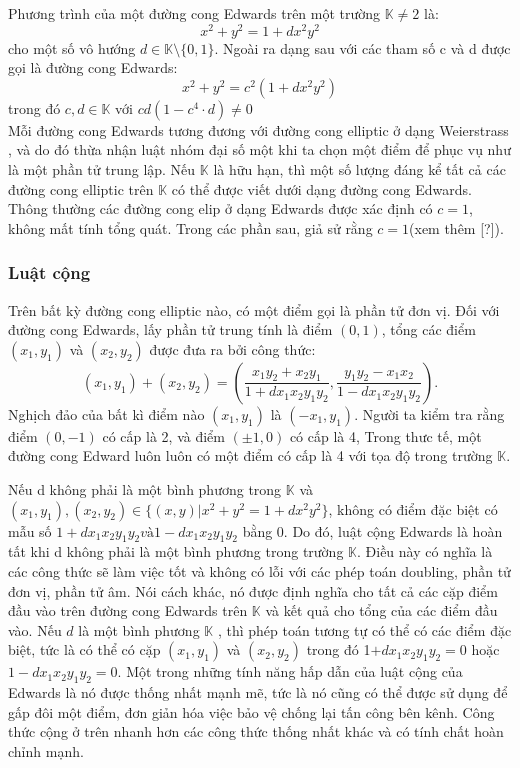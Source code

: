 \documentclass[a4paper,12pt]{report}
\begin{document}
Phương trình của một đường cong Edwards trên một trường $\mathbb{K} \neq 2$ là:
\begin{displaymath}
x^{2}+y^{2}=1+dx^{2}y^{2}
\end{displaymath}
cho một số vô hướng  $d \in \mathbb{K} \setminus \{0,1\}$. Ngoài ra dạng sau với các tham số c và d được gọi là đường cong Edwards:
\begin{displaymath}
x^2 + y^2 = c^2(1 + dx^2y^2)
\end{displaymath}
trong đó $c, d \in \mathbb{K}$ với $cd(1 - c^4\cdot d) \neq 0$ \\
Mỗi đường cong Edwards tương đương với đường cong elliptic ở dạng Weierstrass , và do đó thừa nhận luật nhóm đại số một khi ta chọn một điểm để phục vụ như là một phần tử trung lập. Nếu $\mathbb{K}$ là hữu hạn, thì một số lượng đáng kể tất cả các đường cong elliptic trên $\mathbb{K}$ có thể được viết dưới dạng đường cong Edwards. Thông thường các đường cong elip ở dạng Edwards được xác định có $c = 1$, không mất tính tổng quát. Trong các phần sau, giả sử rằng $c = 1$(xem thêm [?]).
\subsubsection{Luật cộng}
Trên bất kỳ đường cong elliptic nào, có một điểm gọi là phần tử đơn vị. Đối với đường cong Edwards, lấy phần tử trung tính là điểm $(0, 1)$, tổng các điểm $(x_1,  y_1)$ và $(x_2 ,y_2)$ được đưa ra bởi công thức:
\begin{displaymath}
(x_1, y_1) + (x_2, y_2) = \left( \frac{x_1y_2 + x_2y_1}{1 + dx_1x_2y_1y_2}, \frac{y_1y_2 - x_1x_2}{1 - dx_1x_2y_1y_2} \right).
\end{displaymath}
Nghịch đảo của bất kì điểm nào $(x_1, y_1)$ là $(-x_1, y_1)$. Người ta kiểm tra rằng điểm $(0, -1)$ có cấp là 2, và điểm $(\pm 1, 0)$ có cấp là 4, Trong thưc tế, một đường cong Edward luôn luôn có một điểm có cấp là 4 với tọa độ trong trường $\mathbb{K}$.

Nếu d không phải là một bình phương trong $\mathbb{K}$ và $\displaystyle (x_{1}, y_{1}), (x_{2}, y_{2}) \in \{(x, y)|x^{2} + y^{2} = 1 + dx^{2}y^{2} \}$, không có điểm đặc biệt có mẫu số $1 +  dx_1x_2y_1y_2 và 1 -  dx_1 x_2y_1y_2$ bằng 0. Do đó, luật cộng Edwards là hoàn tất khi d không phải là một bình phương trong trường $\mathbb{K}$. Điều này có nghĩa là các công thức sẽ làm việc tốt và không có lỗi với các phép toán doubling, phần tử đơn vị, phần tử âm. Nói cách khác, nó được định nghĩa cho tất cả các cặp điểm đầu vào trên đường cong Edwards trên $\mathbb{K}$ và kết quả cho tổng của các điểm đầu vào.
Nếu $d$ là một bình phương $\mathbb{K}$ , thì phép toán tương tự có thể có các điểm đặc biệt, tức là có thể có cặp $(x_1, y_1)$ và $(x_2, y_2)$ trong đó 1$ +  dx_1x_2y_1y_2 = 0$ hoặc $1 -  dx_1x_2y_1y_2 = 0$.
Một trong những tính năng hấp dẫn của luật cộng của Edwards là nó được thống nhất mạnh mẽ, tức là nó cũng có thể được sử dụng để gấp đôi một điểm, đơn giản hóa việc bảo vệ chống lại tấn công bên kênh. Công thức cộng ở trên nhanh hơn các công thức thống nhất khác và có tính chất hoàn chỉnh mạnh.
\end{document}
